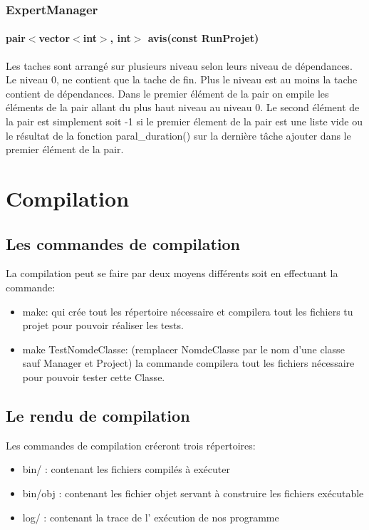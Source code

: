 \documentclass[paper=a4, fontsize=11pt, frenchb, englishb]{article}
\begin{document}
			\subsubsection{ExpertManager}
			
				\paragraph{pair$<$vector$<$int$>$, int$>$ avis(const RunProjet)}
				
Les taches sont arrangé sur plusieurs niveau selon leurs niveau de dépendances. Le niveau 0, ne contient que la tache de fin. Plus le niveau est au moins la tache contient de dépendances. Dans le premier élément de la pair on empile les éléments de la pair allant du plus haut niveau au niveau 0. Le second élément de la pair est simplement soit -1 si le premier élement de la pair est une liste vide ou le résultat de la fonction paral\_duration() sur la dernière tâche ajouter dans le premier élément de la pair.
	
	\section{Compilation}
	
		\subsection{Les commandes de compilation}
		
La compilation peut se faire par deux moyens différents soit en effectuant la commande:

\begin{itemize}
	\item make: qui crée tout les répertoire nécessaire et compilera tout les fichiers tu projet pour pouvoir réaliser les tests.
	\item make TestNomdeClasse: (remplacer NomdeClasse par le nom d'une classe sauf Manager et Project) la commande compilera tout les fichiers nécessaire pour pouvoir tester cette Classe.
\end{itemize}
		
		\subsection{Le rendu de compilation}
		
Les commandes de compilation créeront trois répertoires:

\begin{itemize}
	\item bin/ : contenant les fichiers compilés à exécuter
	\item bin/obj : contenant les fichier objet servant à construire les fichiers exécutable
	\item log/ : contenant la trace de l' exécution de nos programme
\end{itemize}
	
\end{document}
